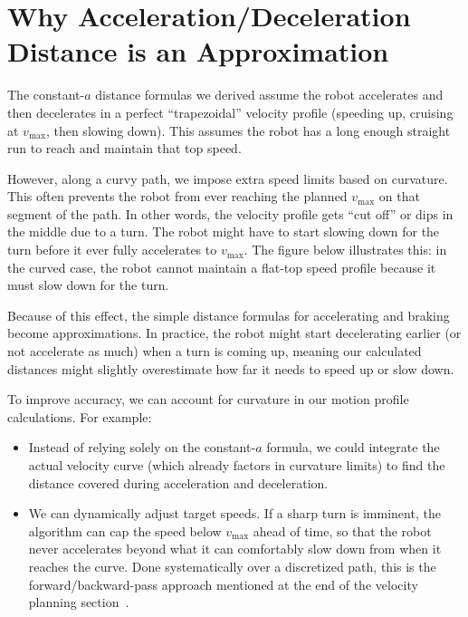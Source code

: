 \documentclass[11pt]{article}
\begin{document}
\section{Why Acceleration/Deceleration Distance is an Approximation}

The constant-$a$ distance formulas we derived assume the robot accelerates and then decelerates in a perfect “trapezoidal” velocity profile (speeding up, cruising at $v_{\max}$, then slowing down). This assumes the robot has a long enough straight run to reach and maintain that top speed.

However, along a curvy path, we impose extra speed limits based on curvature. This often prevents the robot from ever reaching the planned $v_{\max}$ on that segment of the path. In other words, the velocity profile gets “cut off” or dips in the middle due to a turn. The robot might have to start slowing down for the turn before it ever fully accelerates to $v_{\max}$. The figure below illustrates this: in the curved case, the robot cannot maintain a flat-top speed profile because it must slow down for the turn.


Because of this effect, the simple distance formulas for accelerating and braking become approximations. In practice, the robot might start decelerating earlier (or not accelerate as much) when a turn is coming up, meaning our calculated distances might slightly overestimate how far it needs to speed up or slow down.

To improve accuracy, we can account for curvature in our motion profile calculations. For example:
\begin{itemize}
  \item Instead of relying solely on the constant-$a$ formula, we could integrate the actual velocity curve (which already factors in curvature limits) to find the distance covered during acceleration and deceleration.
  \item We can dynamically adjust target speeds. If a sharp turn is imminent, the algorithm can cap the speed below $v_{\max}$ ahead of time, so that the robot never accelerates beyond what it can comfortably slow down from when it reaches the curve. Done systematically over a discretized path, this is the forward/backward-pass approach mentioned at the end of the velocity planning section~\cite{bobrow,toppra}.
\end{itemize}
\end{document}
